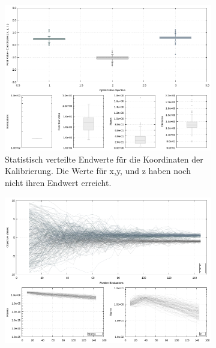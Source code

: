 %
\lipsum[1]
%
\begin{figure}[!ht]
         \centering
         \begin{subfigure}[h]{0.4\textwidth}
                 \centering
                 \includegraphics[width=\textwidth]{img/calibration/aborted_calibration_ant0-boxes.png}
                 \caption{Statistisch verteilte Endwerte für die Koordinaten der Kalibrierung. Die Werte für x,y, und z haben noch nicht ihren Endwert erreicht.}
                 \label{fig:abortedFinal_Calibration_Ant0_ES-boxes}
         \end{subfigure}
%
\qquad         
%
         \begin{subfigure}[h]{0.4\textwidth}
                 \centering
                 \includegraphics[width=\textwidth]{img/calibration/aborted_calibration_ant0-lines.png}

\end{subfigure}
\end{figure}
